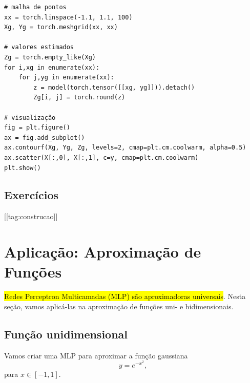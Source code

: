 \begin{lstlisting}
# malha de pontos
xx = torch.linspace(-1.1, 1.1, 100)
Xg, Yg = torch.meshgrid(xx, xx)

# valores estimados
Zg = torch.empty_like(Xg)
for i,xg in enumerate(xx):
    for j,yg in enumerate(xx):
        z = model(torch.tensor([[xg, yg]])).detach()
        Zg[i, j] = torch.round(z)

# visualização
fig = plt.figure()
ax = fig.add_subplot()
ax.contourf(Xg, Yg, Zg, levels=2, cmap=plt.cm.coolwarm, alpha=0.5)
ax.scatter(X[:,0], X[:,1], c=y, cmap=plt.cm.coolwarm)
plt.show()
\end{lstlisting}

\subsection{Exercícios}

[[tag:construcao]]


\section{Aplicação: Aproximação de Funções}\label{cap_mlp_sec_apfun}

\hl{Redes Perceptron Multicamadas (MLP) são aproximadoras universais}. Nesta seção, vamos aplicá-las na aproximação de funções uni- e bidimensionais.

\subsection{Função unidimensional}

Vamos criar uma MLP para aproximar a função gaussiana
\begin{equation}
  y = e^{-x^2},
\end{equation}
para $x\in [-1,1]$.

